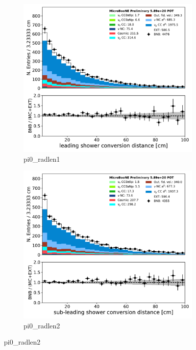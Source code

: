 \begin{figure}[H] 
\begin{center}
    \begin{subfigure}[b]{0.3\textwidth}
    \centering
    \includegraphics[width=1.00\textwidth]{pi0/inputs/pi0_radlen1_03182020_presel.pdf}
    \caption{\label{fig:pi0:inputs:radlen1:RUN1} pi0\_radlen1}
    \end{subfigure}
    \begin{subfigure}[b]{0.3\textwidth}
    \centering
    \includegraphics[width=1.00\textwidth]{pi0/inputs/pi0_radlen2_03182020_presel.pdf}
    \caption{\label{fig:pi0:inputs:radlen2:RUN1} pi0\_radlen2}
    \end{subfigure}
\end{center}
\end{figure}



